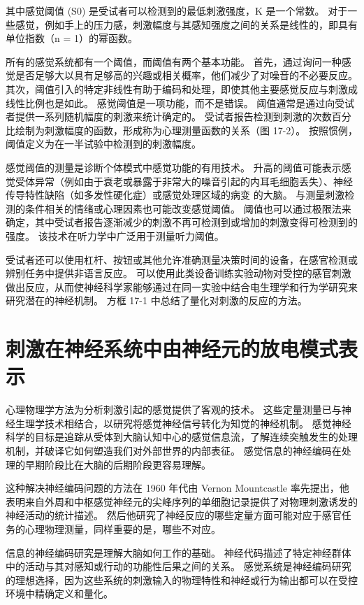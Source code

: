 其中感觉阈值 (S0) 是受试者可以检测到的最低刺激强度，K 是一个常数。 对于一些感觉，例如手上的压力感，刺激幅度与其感知强度之间的关系是线性的，即具有单位指数（n = 1）的幂函数。

所有的感觉系统都有一个阈值，而阈值有两个基本功能。 首先，通过询问一种感觉是否足够大以具有足够高的兴趣或相关概率，他们减少了对噪音的不必要反应。 其次，阈值引入的特定非线性有助于编码和处理，即使其他主要感觉反应与刺激成线性比例也是如此。 感觉阈值是一项功能，而不是错误。 阈值通常是通过向受试者提供一系列随机幅度的刺激来统计确定的。 受试者报告检测到刺激的次数百分比绘制为刺激幅度的函数，形成称为心理测量函数的关系（图 17-2）。 按照惯例，阈值定义为在一半试验中检测到的刺激幅度。

感觉阈值的测量是诊断个体模式中感觉功能的有用技术。 升高的阈值可能表示感觉受体异常（例如由于衰老或暴露于非常大的噪音引起的内耳毛细胞丢失）、神经传导特性缺陷（如多发性硬化症）或感觉处理区域的病变 的大脑。 与测量刺激检测的条件相关的情绪或心理因素也可能改变感觉阈值。 阈值也可以通过极限法来确定，其中受试者报告逐渐减少的刺激不再可检测到或增加的刺激变得可检测到的强度。 该技术在听力学中广泛用于测量听力阈值。

受试者还可以使用杠杆、按钮或其他允许准确测量决策时间的设备，在感官检测或辨别任务中提供非语言反应。 可以使用此类设备训练实验动物对受控的感官刺激做出反应，从而使神经科学家能够通过在同一实验中结合电生理学和行为学研究来研究潜在的神经机制。 方框 17-1 中总结了量化对刺激的反应的方法。



\section{刺激在神经系统中由神经元的放电模式表示}
心理物理学方法为分析刺激引起的感觉提供了客观的技术。 这些定量测量已与神经生理学技术相结合，以研究将感觉神经信号转化为知觉的神经机制。 感觉神经科学的目标是追踪从受体到大脑认知中心的感觉信息流，了解连续突触发生的处理机制，并破译它如何塑造我们对外部世界的内部表征。 感觉信息的神经编码在处理的早期阶段比在大脑的后期阶段更容易理解。

这种解决神经编码问题的方法在 1960 年代由 Vernon Mountcastle 率先提出，他表明来自外周和中枢感觉神经元的尖峰序列的单细胞记录提供了对物理刺激诱发的神经活动的统计描述。 然后他研究了神经反应的哪些定量方面可能对应于感官任务的心理物理测量，同样重要的是，哪些不对应。

信息的神经编码研究是理解大脑如何工作的基础。 神经代码描述了特定神经群体中的活动与其对感知或行动的功能性后果之间的关系。 感觉系统是神经编码研究的理想选择，因为这些系统的刺激输入的物理特性和神经或行为输出都可以在受控环境中精确定义和量化。

